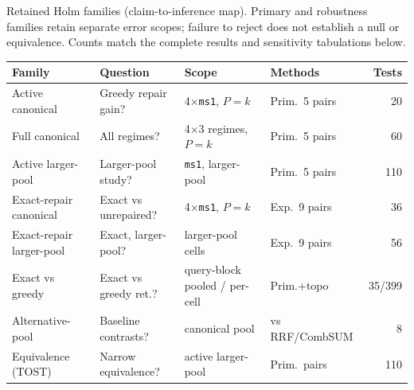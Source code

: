 \begin{supplementtable}
  \caption{Retained Holm families (claim-to-inference map).
    Primary and robustness families retain separate error scopes; failure to reject does not establish a null or equivalence. Counts match the complete results and sensitivity tabulations below.}
  \label{tab:holm-families}
  \sncstable
  \begin{tabularx}{\linewidth}{@{}lYYY r@{}}
    \toprule
    Family & Question & Scope & Methods & Tests \\
    \midrule
    Active canonical & Greedy repair gain? & 4$\times$\texttt{ms1}, $P{=}k$ & Prim.\ 5 pairs & 20 \\
    \addlinespace
    Full canonical & All regimes? & 4$\times$3 regimes, $P{=}k$ & Prim.\ 5 pairs & 60 \\
    \addlinespace
    Active larger-pool & Larger-pool study? & \texttt{ms1}, larger-pool & Prim.\ 5 pairs & 110 \\
    \addlinespace
    Exact-repair canonical & Exact vs unrepaired? & 4$\times$\texttt{ms1}, $P{=}k$ & Exp.\ 9 pairs & 36 \\
    \addlinespace
    Exact-repair larger-pool & Exact, larger-pool? & larger-pool cells & Exp.\ 9 pairs & 56 \\
    \addlinespace
    Exact vs greedy & Exact vs greedy ret.? & query-block pooled / per-cell & Prim.+topo & 35/399 \\
    \addlinespace
    Alternative-pool & Baseline contrasts? & canonical pool & vs RRF/CombSUM & 8 \\
    \addlinespace
    Equivalence (TOST) & Narrow equivalence? & active larger-pool & Prim.\ pairs & 110 \\
    \bottomrule
  \end{tabularx}
\end{supplementtable}